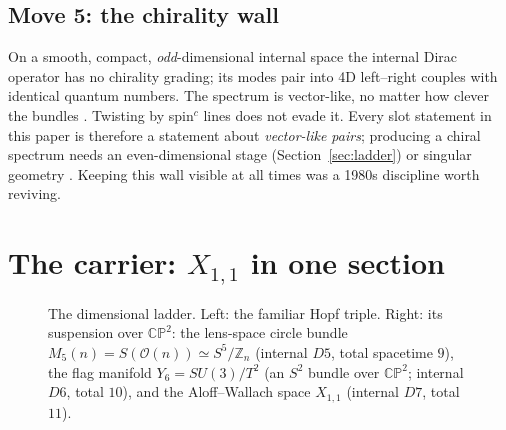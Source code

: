 \documentclass[11pt]{article}
\newcommand{\X}{X_{1,1}}
\newcommand{\CP}{\mathbb{CP}}
\newcommand{\Z}{\mathbb{Z}}
\begin{document}
\subsection{Move 5: the chirality wall}

On a smooth, compact, \emph{odd}-dimensional internal space the internal Dirac operator has
no chirality grading; its modes pair into 4D left--right couples with identical quantum
numbers. The spectrum is vector-like, no matter how clever the bundles
\cite{Witten81,Witten83}. Twisting by spin$^c$ lines does not evade it. Every slot statement
in this paper is therefore a statement about \emph{vector-like pairs}; producing a chiral
spectrum needs an even-dimensional stage (Section~\ref{sec:ladder}) or singular geometry
\cite{KK2025}. Keeping this wall visible at all times was a 1980s discipline worth reviving.

\section{The carrier: $\X$ in one section}

\begin{figure}[t]
\centering
{}
\caption{The dimensional ladder. Left: the familiar Hopf triple. Right: its suspension over
$\CP^2$: the lens-space circle bundle $M_5(n)=S(\mathcal O(n))\simeq S^5/\Z_n$ (internal
$D5$, total spacetime $9$), the flag manifold $Y_6=SU(3)/T^2$ (an $S^2$ bundle over $\CP^2$;
internal $D6$, total $10$), and the Aloff--Wallach space $\X$ (internal $D7$, total $11$).}
\label{fig:ladder}
\end{figure}
\end{document}
